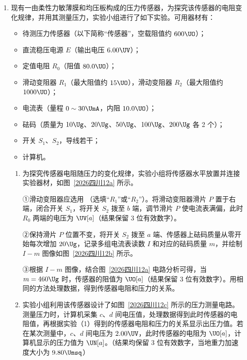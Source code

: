 \documentclass[\gkver]{gaokaozhenti}
\begin{document}
\begin{enumerate}
{（5）根据 $pV = k$ 可得 $p = k\frac{1}{V}$

由图可知 $p-\frac{1}{V}$ 图像斜率不变，即 $p$ 与 $\frac{1}{V}$ 成正比，则压强 $p$ 与体积 $V$ 成反比。
}
\item
现有一由柔性力敏薄膜和均压板构成的压力传感器，为探究该传感器的电阻变化规律，并用其测量压力，实验小组进行了如下实验。可用器材有：

\begin{itemize}
\item
待测压力传感器（以下简称“传感器”，空载阻值约 $600 \UO$）；
\item
直流稳压电源 $E$（输出电压 $6.00 \UV$）；
\item
定值电阻 $R_{0}$（阻值 $80.0 \UO$）；
\item
滑动变阻器 $R_{1}$（最大阻值约 $15 \UO$），滑动变阻器 $R_{2}$（最大阻值约 $1000 \UO$）；
\item
电流表（量程 $0 \sim 30 \UmA$，内阻 $10.0 \UO$）；
\item
砝码（质量为 $10 \Ug$、$20 \Ug$、$50 \Ug$、$100 \Ug$、$200 \Ug$ 各 2 个）；
\item
开关 $S_{1}$、$S_{2}$，导线若干；
\item
计算机。
\end{itemize}


\begin{enumerate}
\item
为探究传感器电阻随压力的变化规律，实验小组将传感器水平放置并连接实验器材，如图~\ref{2026四川12a} 所示。

①滑动变阻器应选用 （选填“$R_{1}$”或“$R_{2}$”）。将滑动变阻器滑片 $P$ 置于右端，闭合开关 $S_{1}$，将开关 $S_{2}$ 拨至 $b$ 端，调节滑片 $P$ 使电流表满偏，此时 $R_{0}$ 两端的电压为  $\UV[a]$（结果保留 3 位有效数字）。

②保持滑片 $P$ 位置不变，将开关 $S_{2}$ 拨至 $a$ 端、传感器上砝码质量从零开始每次增加 $20 \Ug$，记录多组电流表读数 $I$ 和对应的砝码质量 $m$，并绘制 $I-m$ 图像如图~\ref{2026四川12b} 所示。

③根据 $I-m$ 图像，结合图~\ref{2026四川12a} 电路分析可得，当 $m = 460 \Ug$ 时，传感器的阻值为  $\UO[a]$（结果保留 3 位有效数字）。用相同的方法处理数据，得到传感器电阻和压力的关系。
\item
实验小组利用该传感器设计了如图~\ref{2026四川12c} 所示的压力测量电路。测量压力时，计算机采集 $c$、$d$ 间电压值，处理数据得到此时传感器的电阻值，再根据实验（1）得到的传感器电阻和压力的关系显示出压力值。若在某次测量中，$c$、$d$ 间电压为 $2.00 \UV$，此时传感器的电阻为  $\UO[a]$，计算机显示的压力值为  $\UN[a]$。（结果均保留 3 位有效数字，当地重力加速度大小为 $9.80 \Umsq$）
\end{enumerate}


\end{enumerate}
\end{document}
